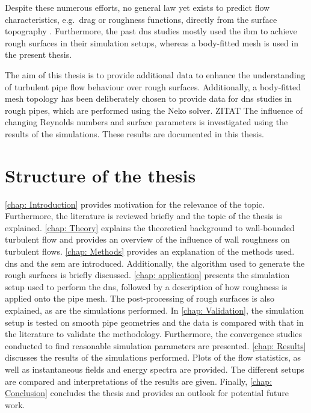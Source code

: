 Despite these numerous efforts, no general law yet exists to predict flow characteristics, e.g.\ drag or roughness functions, directly from the surface topography \citep{chungPredictingDragRough2021}.
Furthermore, the past \acrshort{dns} studies mostly used the \acrfull{ibm} to achieve rough surfaces in their simulation setups, whereas a body-fitted mesh is used in the present thesis.

The aim of this thesis is to provide additional data to enhance the understanding  of turbulent pipe flow behaviour over rough surfaces.
Additionally, a body-fitted mesh topology has been deliberately chosen to provide data for \acrshort{dns} studies in rough pipes, which are performed using the Neko solver.
 ZITAT
The influence of changing Reynolds numbers and surface parameters is investigated using the results of the simulations.
These results are documented in this thesis.

\section{Structure of the thesis}
\autoref{chap: Introduction} provides motivation for the relevance of the topic.
Furthermore, the  literature is reviewed briefly and the topic of the thesis is explained.
\autoref{chap: Theory} explains the theoretical background to wall-bounded turbulent flow and provides an overview  of the influence of wall roughness on turbulent flows.
\autoref{chap: Methods} provides an explanation of the methods used.
\acrshort{dns} and the \acrshort{sem} are introduced.
Additionally, the algorithm used to generate the rough surfaces is briefly discussed.
\autoref{chap: application} presents the simulation setup used to perform the \acrshort{dns}, followed by a description of  how roughness is applied onto the pipe mesh.
The post-processing of rough surfaces is also explained, as are  the  simulations performed.
In \autoref{chap: Validation}, the simulation setup is tested on smooth pipe geometries and the data is compared with that in the  literature to validate the methodology.
Furthermore, the convergence studies  conducted  to find reasonable simulation parameters are presented.
\autoref{chap: Results} discusses the results of the simulations performed.
Plots of the flow statistics, as well as instantaneous fields and energy spectra are provided.
The different setups are compared and interpretations of the results are given.
Finally, \autoref{chap: Conclusion} concludes the thesis and provides an outlook for potential future work.


